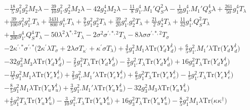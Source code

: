 {\begin{align}
 &-\frac{18}{5} g_{1}^{2} g_{2}^{2} M_2 \lambda -\frac{39}{10} g_{1'}^{2} g_{2}^{2} M_2 \lambda -42 g_{2}^{4} M_2 \lambda -\frac{11}{8} g_{1'}^{4} M_1' Q_{S}^{2} \lambda -\frac{1}{50} g_{1'}^{4} M_1' Q_{S}^{4} \lambda +\frac{261}{50} g_{1}^{4} T_{\lambda} \nonumber \\ 
 &+\frac{39}{100} g_{1}^{2} g_{1'}^{2} T_{\lambda} +\frac{3431}{800} g_{1'}^{4} T_{\lambda} +\frac{9}{5} g_{1}^{2} g_{2}^{2} T_{\lambda} +\frac{39}{20} g_{1'}^{2} g_{2}^{2} T_{\lambda} +\frac{21}{2} g_{2}^{4} T_{\lambda} +\frac{11}{32} g_{1'}^{4} Q_{S}^{2} T_{\lambda} \nonumber \\ 
 &+\frac{1}{200} g_{1'}^{4} Q_{S}^{4} T_{\lambda} -50 \lambda^{2} \lambda^{*,2} T_{\lambda} -2 \sigma^{2} \sigma^{\prime,*,2} T_{\lambda} -8 \lambda \sigma \sigma^{\prime,*,2} T_{\sigma} \nonumber \\ 
 &-2 \kappa^{\prime,*} \sigma^{\prime,*} \Big(2 \kappa^\prime \lambda T_{\sigma}  + 2 \lambda \sigma T_{\kappa^\prime}  + \kappa^\prime \sigma T_{\lambda} \Big)+\frac{4}{5} g_{1}^{2} M_1 \lambda \mbox{Tr}\Big({Y_d  Y_{d}^{\dagger}}\Big) +\frac{6}{5} g_{1'}^{2} M_1' \lambda \mbox{Tr}\Big({Y_d  Y_{d}^{\dagger}}\Big) \nonumber \\ 
 &-32 g_{3}^{2} M_3 \lambda \mbox{Tr}\Big({Y_d  Y_{d}^{\dagger}}\Big) -\frac{2}{5} g_{1}^{2} T_{\lambda} \mbox{Tr}\Big({Y_d  Y_{d}^{\dagger}}\Big) -\frac{3}{5} g_{1'}^{2} T_{\lambda} \mbox{Tr}\Big({Y_d  Y_{d}^{\dagger}}\Big) +16 g_{3}^{2} T_{\lambda} \mbox{Tr}\Big({Y_d  Y_{d}^{\dagger}}\Big) \nonumber \\ 
 &-\frac{12}{5} g_{1}^{2} M_1 \lambda \mbox{Tr}\Big({Y_e  Y_{e}^{\dagger}}\Big) +\frac{2}{5} g_{1'}^{2} M_1' \lambda \mbox{Tr}\Big({Y_e  Y_{e}^{\dagger}}\Big) +\frac{6}{5} g_{1}^{2} T_{\lambda} \mbox{Tr}\Big({Y_e  Y_{e}^{\dagger}}\Big) -\frac{1}{5} g_{1'}^{2} T_{\lambda} \mbox{Tr}\Big({Y_e  Y_{e}^{\dagger}}\Big) \nonumber \\ 
 &-\frac{8}{5} g_{1}^{2} M_1 \lambda \mbox{Tr}\Big({Y_u  Y_{u}^{\dagger}}\Big) +\frac{3}{5} g_{1'}^{2} M_1' \lambda \mbox{Tr}\Big({Y_u  Y_{u}^{\dagger}}\Big) -32 g_{3}^{2} M_3 \lambda \mbox{Tr}\Big({Y_u  Y_{u}^{\dagger}}\Big) \nonumber \\ 
 &+\frac{4}{5} g_{1}^{2} T_{\lambda} \mbox{Tr}\Big({Y_u  Y_{u}^{\dagger}}\Big) -\frac{3}{10} g_{1'}^{2} T_{\lambda} \mbox{Tr}\Big({Y_u  Y_{u}^{\dagger}}\Big) +16 g_{3}^{2} T_{\lambda} \mbox{Tr}\Big({Y_u  Y_{u}^{\dagger}}\Big) -\frac{8}{5} g_{1}^{2} M_1 \lambda \mbox{Tr}\Big({\kappa  \kappa^{\dagger}}\Big) \nonumber \\ 

\end{align}}
